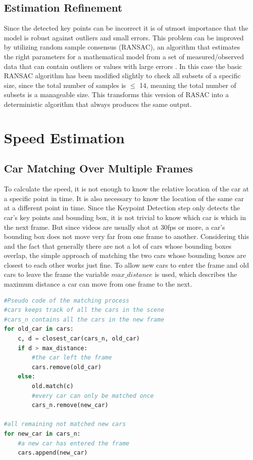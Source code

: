 \documentclass[conference]{IEEEtran}
\begin{document}
\subsection{Estimation Refinement}

Since the detected key points can be incorrect it is of utmost importance that the model is robust against outliers and small errors. This problem can be improved by utilizing random sample consensus (RANSAC), an algorithm that estimates the right parameters for a mathematical model from a set of measured/observed data that can contain outliers or values with large errors \cite{RANSAC}. In this case the basic RANSAC algorithm has been modified slightly to check all subsets of a specific size, since the total number of samples is $\leq$ 14, meaning the total number of subsets is a manageable size. This transforms this version of RASAC into a deterministic algorithm that always produces the same output.

\section{Speed Estimation}

\subsection{Car Matching Over Multiple Frames}

To calculate the speed, it is not enough to know the relative location of the car at a specific point in time. It is also necessary to know the location of the same car at a different point in time. Since the Keypoint Detection step only detects the car's key points and bounding box, it is not trivial to know which car is which in the next frame. But since videos are usually shot at 30fps or more, a car's bounding box does not move very far from one frame to another. Considering this and the fact that generally there are not a lot of cars whose bounding boxes overlap, the simple approach of matching the two cars whose bounding boxes are closest to each other works just fine. To allow new cars to enter the frame and old cars to leave the frame the variable $max\_distance$ is used, which describes the maximum distance a car can move from one frame to the next.

\begin{lstlisting}[language=Python, basicstyle=\small, tabsize=4]
#Pseudo code of the matching process
#cars keeps track of all the cars in the scene
#cars_n contains all the cars in the new frame
for old_car in cars:
    c, d = closest_car(cars_n, old_car)
    if d > max_distance:
        #the car left the frame
        cars.remove(old_car)
    else:
        old.match(c)
        #every car can only be matched once
        cars_n.remove(new_car)

#all remaining not matched new cars
for new_car in cars_n: 
    #a new car has entered the frame 
    cars.append(new_car) 
\end{lstlisting}
\end{document}

